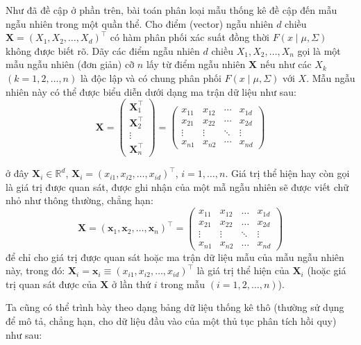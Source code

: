 Như đã đề cập ở phần trên, bài toán phân loại mẫu thống kê đề cập đến mẫu ngẫu nhiên trong một quần thể. Cho điểm (vector) ngẫu nhiên $d$ chiều $\mathbf{X} = (X_1, X_2, \ldots, X_d)^{\top}$ có hàm phân phối xác suất đồng thời $F(x \mid \mu, \Sigma)$ không được biết rõ. Dãy các điểm ngẫu nhiên $d$ chiều $X_1,X_2,\ldots,X_n$ gọi là một mẫu ngẫu nhiên (đơn giản) cỡ $n$ lấy từ điểm ngẫu nhiên $\mathbf{X}$ nếu như các $X_k$ $(k=1, 2,\ldots, n)$ là độc lập và có chung phân phối $F(x \mid \mu, \Sigma)$ với $X$. 
Mẫu ngẫu nhiên này có thể được biểu diễn dưới dạng ma trận dữ liệu như sau:
\[
\mathbf{X}=
\begin{pmatrix}
\mathbf{X}_1^{\top}\\
\mathbf{X}_2^{\top}\\
\vdots\\
\mathbf{X}_n^{\top}
\end{pmatrix}
=
\begin{pmatrix}
x_{11} & x_{12} & \cdots & x_{1d}\\
x_{21} & x_{22} & \cdots & x_{2d}\\
\vdots & \vdots & \ddots & \vdots\\
x_{n1} & x_{n2} & \cdots & x_{nd}
\end{pmatrix}
\]

ở đây $\mathbf{X}_i \in \mathbb{R}^d$, $\mathbf{X}_i = (x_{i1}, x_{i2}, \ldots, x_{id})^{\top}$, $i=1,\ldots,n$. Giá trị thể hiện hay còn gọi là giá trị được quan sát, được ghi nhận của một mẫ ngẫu nhiên sẽ được viết chữ nhỏ như thông thường, chẳng hạn:
\[
\mathbf{X} = (\bm{x}_1, \bm{x}_2, \dots, \bm{x}_n)^{\top} = 
\begin{pmatrix}
x_{11} & x_{12} & \dots & x_{1d} \\
x_{21} & x_{22} & \dots & x_{2d} \\
\vdots & \vdots & \ddots & \vdots \\
x_{n1} & x_{n2} & \dots & x_{nd}
\end{pmatrix}
\]
để chỉ cho giá trị được quan sát hoặc ma trận dữ liệu mẫu của mẫu ngẫu nhiên này, trong đó: $\bm{X}_i = \bm{x}_i \equiv (x_{i1}, x_{i2}, \dots, x_{id})^{\top}$ là giá trị thể hiện của $\bm{X}_i$ (hoặc giá trị quan sát được của $\bm{X}$ ở lần thứ $i$ trong mẫu $(i=1,2,…,n)$).

Ta cũng có thể trình bày theo dạng bảng dữ liệu thống kê thô (thường sử dụng để mô tả, chẳng hạn, cho dữ liệu đầu vào của một thủ tục phân tích hồi quy) như sau:

